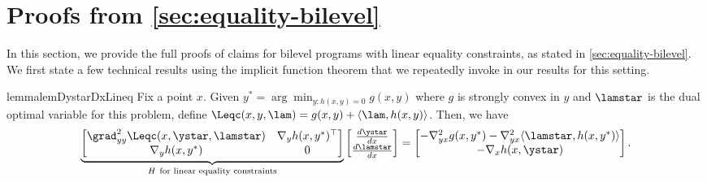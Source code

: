 \section{Proofs from \cref{sec:equality-bilevel}} \label{sec:appendix_linear_equality}
In this section, we provide the full proofs of 
claims for bilevel programs with linear equality constraints, as stated in \cref{sec:equality-bilevel}. We first state a few technical results using the implicit function theorem that we repeatedly invoke in our results for this setting. 

\begin{restatable}{lemma}{lemDystarDxLineq}\label{lem:dystarDxLinEq}
    Fix a point $x$. Given $y^*= \arg\min_{y: h(x,y)=0} g(x,y)$ where $g$ is strongly convex in $y$ and $\lamstar$ is the dual optimal variable for this problem, define $\Leqc(x,y,\lam)=g(x,y)+\langle\lam, h(x,y)\rangle$. Then, we have 
\[\underbrace{\begin{bmatrix}\grad^2_{yy}\Leqc(x,\ystar,\lamstar) & \nabla_y h(x,y^{*})^{\top}\\
\nabla_y h(x,y^{*}) & 0
\end{bmatrix}}_{H ~\text{for linear equality constraints}}\begin{bmatrix}\frac{d\ystar}{dx}\\
\frac{d\lamstar}{dx}
\end{bmatrix}=\begin{bmatrix}-\nabla^2_{yx}g(x,y^{*})-\nabla^2_{yx}\langle\lamstar, h(x,y^{*})\rangle\\
-\nabla_x h(x,\ystar)\end{bmatrix}.
\]
\end{restatable}
